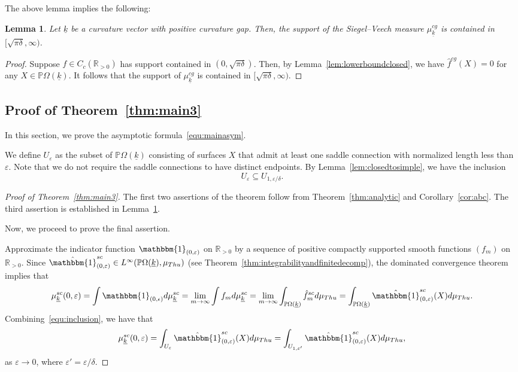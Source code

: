 \documentclass{compositio}
\numberwithin{equation}{section}
\numberwithin{figure}{section}
\theoremstyle{definition}
\theoremstyle{plain}
\newtheorem{lemma}[definition]{Lemma}
\begin{document}
{The above lemma implies the following:

\begin{lemma}\label{lem:closedsupport}
    Let $\underline k$ be a curvature vector with positive curvature gap. Then, the support of the Siegel–Veech measure $\mu^{cg}_{\underline k}$ is contained in $[\sqrt{\pi\delta},\infty)$.
\end{lemma}

\begin{proof}
    Suppose $f\in C_c(\mathbb{R}_{>0})$ has support contained in $(0,\sqrt{\pi\delta})$. Then, by Lemma~\ref{lem:lowerboundclosed}, we have $    \hat{f}^{cg}(X) = 0$
    for any $X\in \mathbb{P}\Omega(\underline{k})$. It follows that the support of $\mu^{cg}_{\underline k}$ is contained in $[\sqrt{\pi\delta},\infty)$.
\end{proof}

\subsection{Proof of Theorem~\ref{thm:main3}}\label{sec:asymptotic0}

In this section, we prove the asymptotic formula~\eqref{equ:mainasym}.

We define $U_{\varepsilon}$ as the subset of $\mathbb{P}\Omega(\underline k)$ consisting of surfaces $X$ that admit at least one saddle connection with normalized length less than $\varepsilon$. Note that we do not require the saddle connections to have distinct endpoints. By Lemma~\ref{lem:closedtosimple}, we have the inclusion
\begin{equation}\label{equ:inclusion}
    U_\varepsilon \subseteq U_{1, \varepsilon/\delta}.
\end{equation}

\begin{proof}[Proof of Theorem~\ref{thm:main3}]
The first two assertions of the theorem follow from Theorem~\ref{thm:analytic} and Corollary~\ref{cor:abc}. The third assertion is established in Lemma~\ref{lem:closedsupport}.

Now, we proceed to prove the final assertion.

    Approximate the indicator function $\mathbbm{1}_{(0,\varepsilon)}$ on $\mathbb{R}_{>0}$ by a sequence of positive compactly supported smooth functions $(f_m)$ on $\mathbb{R}_{>0}$. Since $\hat{\mathbbm{1}}^{sc}_{(0,\varepsilon)} \in L^\infty(\mathbb{P}\Omega(\underline{k}), \mu_{Thu})$ (see Theorem~\ref{thm:integrabilityandfinitedecomp}), the dominated convergence theorem implies that
    $$\mu^{sc}_{\underline{k}}(0,\varepsilon)
    =\int \mathbbm{1}_{(0,\epsilon)}d\mu^{sc}_{\underline{k}} = \lim_{m\to\infty}\int f_md\mu^{sc}_{\underline{k}}=\lim_{m\to\infty} \int_{\mathbb{P}\Omega(\underline{k})}\hat{f}_m^{sc}d\mu_{Thu} = \int_{\mathbb{P}\Omega(\underline{k})}\hat{\mathbbm{1}}^{sc}_{(0,\varepsilon)}(X)d\mu_{Thu}.$$
    Combining~\eqref{equ:inclusion}, we have that
    $$
    \mu^{sc}_{\underline{k}}(0,\varepsilon)
    = \int_{U_{\varepsilon}}\hat{\mathbbm{1}}^{sc}_{(0,\varepsilon)}(X)d\mu_{Thu}
    =\int_{U_{1,\varepsilon'}}\hat{\mathbbm{1}}^{sc}_{(0,\varepsilon)}(X)d\mu_{Thu},
    $$
    as $\varepsilon\to 0$, where $\varepsilon' = \varepsilon/\delta$.
    

\end{proof}}
\end{document}
